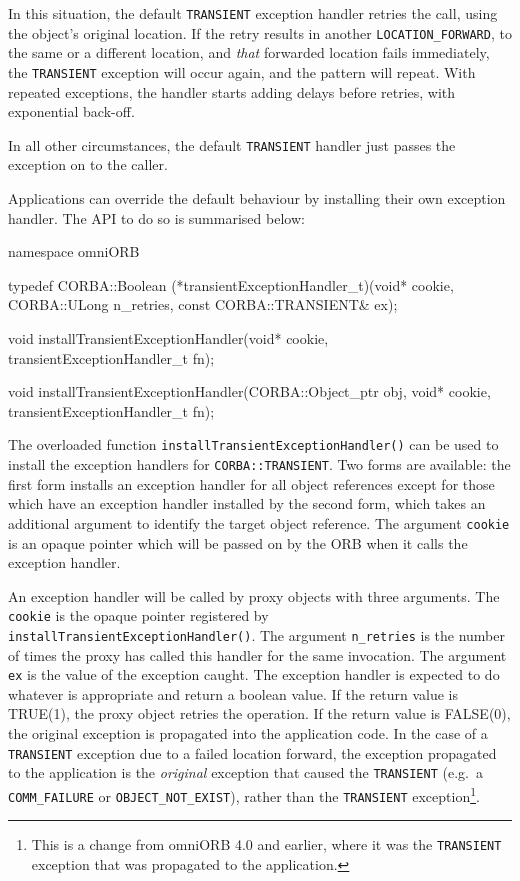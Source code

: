 \documentclass[11pt,twoside,a4paper]{book}
\newcommand{\code}[1]{\texttt{#1}}
\newcommand{\op}[1]{\texttt{#1()}}
\newcommand{\dsc}{\discretionary{}{}{}}
\begin{document}
In this situation, the default \code{TRANSIENT} exception handler
retries the call, using the object's original location. If the retry
results in another \code{LOCATION\_\dsc{}FORWARD}, to the same or a
different location, and \emph{that} forwarded location fails
immediately, the \code{TRANSIENT} exception will occur again, and the
pattern will repeat. With repeated exceptions, the handler starts
adding delays before retries, with exponential back-off.

In all other circumstances, the default \code{TRANSIENT} handler just
passes the exception on to the caller.

Applications can override the default behaviour by installing their
own exception handler. The API to do so is summarised below:

\begin{cxxlisting}
namespace omniORB {
  
  typedef CORBA::Boolean 
  (*transientExceptionHandler_t)(void* cookie,
                                 CORBA::ULong n_retries,
                                 const CORBA::TRANSIENT& ex);

  void 
  installTransientExceptionHandler(void* cookie,
                                   transientExceptionHandler_t fn);

  void
  installTransientExceptionHandler(CORBA::Object_ptr obj,
                                   void* cookie,
                                   transientExceptionHandler_t fn);
}
\end{cxxlisting}

The overloaded function \op{installTransientExceptionHandler} can be
used to install the exception handlers for \code{CORBA::TRANSIENT}.
Two forms are available: the first form installs an exception handler
for all object references except for those which have an exception
handler installed by the second form, which takes an additional
argument to identify the target object reference. The argument
\code{cookie} is an opaque pointer which will be passed on by the ORB
when it calls the exception handler.

An exception handler will be called by proxy objects with three
arguments. The \code{cookie} is the opaque pointer registered by
\op{installTransientException\dsc{}Handler}. The argument
\code{n\_retries} is the number of times the proxy has called this
handler for the same invocation. The argument \code{ex} is the value
of the exception caught.  The exception handler is expected to do
whatever is appropriate and return a boolean value. If the return
value is TRUE(1), the proxy object retries the operation. If the
return value is FALSE(0), the original exception is propagated into
the application code. In the case of a \code{TRANSIENT} exception due
to a failed location forward, the exception propagated to the
application is the \emph{original} exception that caused the
\code{TRANSIENT} (e.g.\ a \code{COMM\_FAILURE} or
\code{OBJECT\_NOT\_EXIST}), rather than the \code{TRANSIENT}
exception\footnote{This is a change from omniORB 4.0 and earlier,
where it was the \code{TRANSIENT} exception that was propagated to the
application.}.
\end{document}
